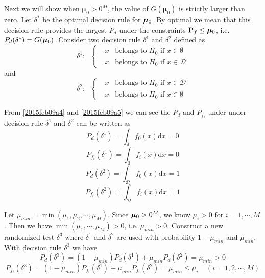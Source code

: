 Next we will show when $\boldsymbol{\mu}_0 > 0^M$, the value of $G(\boldsymbol{\mu}_0)$ is strictly larger than zero.
Let $\delta^\ast$ be the optimal decision rule for $\boldsymbol{\mu}_0$. By optimal  we mean that this decision rule provides the largest $P_d$ under the constraints $\mathbf{P}_f \leq \boldsymbol{\mu}_0$, i.e. $P_d(\delta^\ast) = G(\boldsymbol{\mu}_0)$. Consider two decision rule $\delta^1$ and $\delta^2$ defined as 
\begin{equation}
  \label{2015feb09a4}
  \delta^1:\;\; \begin{cases}
    &x \;\;\;\text{belongs to $H_0$ if } x \in \emptyset \\
    &x \;\;\;\text{belongs to $\bar{H}_0$ if } x \in \mathcal{D}
  \end{cases}
\end{equation}
and
\begin{equation}
  \label{2015feb09a5}
  \delta^2:\;\; \begin{cases}
    &x \;\;\;\text{belongs to $H_0$ if } x \in \mathcal{D} \\
    &x \;\;\;\text{belongs to $\bar{H}_0$ if } x \in \emptyset
  \end{cases}
\end{equation}

From \eqref{2015feb09a4} and \eqref{2015feb09a5} we can see the $P_d$ and $P_{f_i}$ under under decision rule $\delta^1$ and $\delta^2$ can be written as
\begin{equation}
  P_d(\delta^1) = \int_{\emptyset}f_0(x)\mathrm{d}x = 0
\end{equation}
\begin{equation}
    P_{f_i}(\delta^1) = \int_{\emptyset}f_i(x)\mathrm{d}x = 0
\end{equation}
\begin{equation}
    P_d(\delta^2) = \int_{\mathcal{D}}f_0(x)\mathrm{d}x = 1
\end{equation}
\begin{equation}
    P_{f_i}(\delta^2) = \int_{\mathcal{D}}f_i(x)\mathrm{d}x = 1
\end{equation}

Let $\mu_{min} = \min(\mu_1, \mu_2, \cdots, \mu_M)$. Since $\boldsymbol{\mu}_0 > 0^M$, we know $\mu_i > 0$ for $i = 1, \cdots, M$. Then we have $\min(\mu_1, \cdots, \mu_M) > 0$, i.e. $\mu_{min} > 0$. Construct a new randomized test $\delta^3$ where $\delta^1$ and $\delta^2$ are used with probability $1 - \mu_{min} $ and $\mu_{min}$. With decision rule $\delta^3$ we have
\begin{equation}
  P_d(\delta^3) = (1 - \mu_{min})P_d(\delta^1) + \mu_{min}P_d(\delta^2) = \mu_{min} > 0
\end{equation}
\begin{equation}
  P_{f_i}(\delta^3) = (1 - \mu_{min})P_{f_i}(\delta^1) + \mu_{min}P_{f_i}(\delta^2) = \mu_{min} \leq \mu_i \;\;\;\;(i = 1, 2, \cdots, M)
\end{equation}

